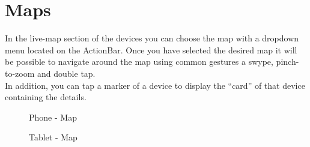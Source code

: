 


\chapter{Maps}
In the live-map section of the devices you can choose the map with a dropdown menu located on the ActionBar. Once you have selected the desired map it will be possible to navigate around the map using common gestures a swype, pinch-to-zoom and double tap. \\ 
In addition, you can tap a marker of a device to display the ``card'' of that device containing the details.



	\begin{figure}[h!]
		  \centering
		  \caption{Phone - Map}
	\end{figure}

	\begin{figure}[h!]
		  \centering
		  \caption{Tablet - Map}
	\end{figure}